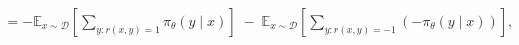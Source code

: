 \documentclass[preview]{standalone}
\begin{document}
\begin{align*}
= -\mathbb{E}_{x \sim \mathcal{D}}\!\left[\sum_{y : r(x,y)=1}\pi_\theta(y \mid x)\right] \;-\; \mathbb{E}_{x \sim \mathcal{D}}\!\left[\sum_{y : r(x,y)=-1}(-\pi_\theta(y \mid x))\right],
\end{align*}
\end{document}
